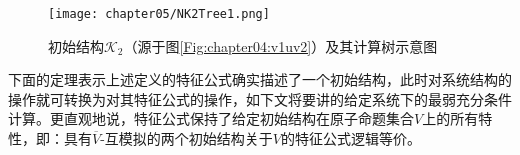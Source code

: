 \begin{example}
	
	
	\begin{figure*}
		\centering
		\texttt{[image: chapter05/NK2Tree1.png]}
		\caption{初始结构$\mathcal{K}_2$（源于图\ref{Fig:chapter04:v1uv2}）及其计算树示意图}\label{fig:K2Tree}
	\end{figure*}
	
	
\end{example}


下面的定理表示上述定义的特征公式确实描述了一个初始结构，此时对系统结构的操作就可转换为对其特征公式的操作，如下文将要讲的给定系统下的最弱充分条件计算。更直观地说，特征公式保持了给定初始结构在原子命题集合$V$上的所有特性，即：具有$\overline{V}$-互模拟的两个初始结构关于$V$的特征公式逻辑等价。


